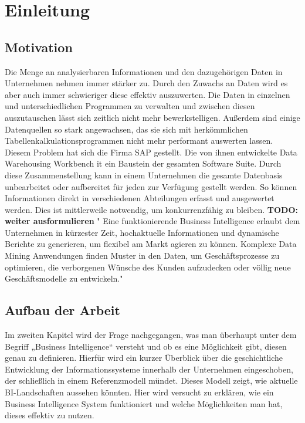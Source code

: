 \chapter{Einleitung}
\label{Kapitel:Einleitung}


\section{Motivation}
 
 Die Menge an analysierbaren  Informationen und den dazugehörigen Daten in Unternehmen nehmen immer stärker zu.  Durch den Zuwachs an Daten wird es aber auch immer schwieriger diese effektiv auszuwerten. Die  Daten in einzelnen und unterschiedlichen Programmen zu verwalten und zwischen diesen auszutauschen lässt sich zeitlich nicht mehr bewerkstelligen. Außerdem sind einige Datenquellen so stark angewachsen, das sie sich mit herkömmlichen Tabellenkalkulationsprogrammen nicht mehr performant auswerten lassen. \\
Diesem Problem hat sich die Firma SAP gestellt. Die von ihnen entwickelte Data Warehousing Workbench it ein Baustein der gesamten Software Suite.  Durch diese Zusammenstellung kann in einem  Unternehmen die gesamte Datenbasis unbearbeitet oder aufbereitet für jeden zur Verfügung gestellt werden. So können Informationen direkt in verschiedenen Abteilungen erfasst und ausgewertet werden. Dies ist mittlerweile notwendig, um konkurrenzfähig zu bleiben. \textbf{TODO: weiter ausformulieren} "
Eine funktionierende Business Intelligence erlaubt dem Unternehmen in kürzester Zeit, hochaktuelle Informationen und dynamische Berichte zu generieren, um flexibel am Markt agieren zu können. Komplexe Data Mining Anwendungen finden Muster in den Daten, um Geschäftsprozesse zu optimieren, die verborgenen Wünsche des Kunden aufzudecken oder völlig neue Geschäftsmodelle zu entwickeln."\\

 
\section{ Aufbau der Arbeit}
 
Im zweiten Kapitel wird der Frage nachgegangen, was man überhaupt unter dem Begriff „Business Intelligence“ versteht und ob es eine Möglichkeit gibt, diesen genau zu definieren. Hierfür wird ein kurzer Überblick über die geschichtliche Entwicklung der Informationssysteme innerhalb der Unternehmen eingeschoben, der schließlich in einem Referenzmodell mündet. Dieses Modell zeigt, wie aktuelle BI-Landschaften aussehen könnten. Hier wird versucht zu erklären, wie ein Business Intelligence System funktioniert und welche Möglichkeiten man hat, dieses effektiv zu nutzen.
 
